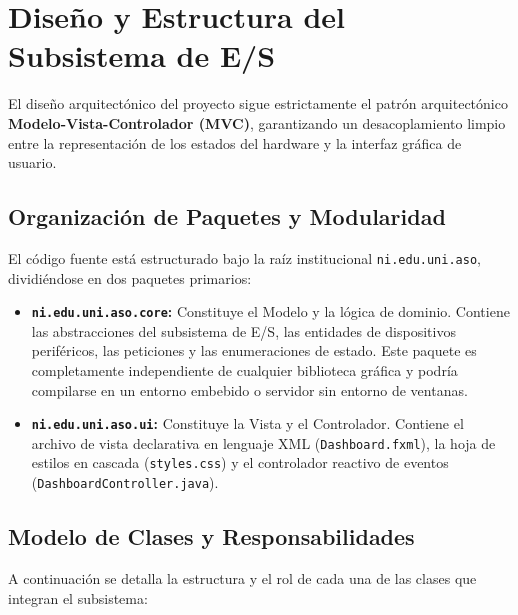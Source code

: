 \documentclass[11pt,letterpaper]{article}
\begin{document}
\section{Diseño y Estructura del Subsistema de E/S}

El diseño arquitectónico del proyecto sigue estrictamente el patrón arquitectónico \textbf{Modelo-Vista-Controlador (MVC)}, garantizando un desacoplamiento limpio entre la representación de los estados del hardware y la interfaz gráfica de usuario.

\subsection{Organización de Paquetes y Modularidad}
El código fuente está estructurado bajo la raíz institucional \texttt{ni.edu.uni.aso}, dividiéndose en dos paquetes primarios:
\begin{itemize}
    \item \textbf{\texttt{ni.edu.uni.aso.core}:} Constituye el Modelo y la lógica de dominio. Contiene las abstracciones del subsistema de E/S, las entidades de dispositivos periféricos, las peticiones y las enumeraciones de estado. Este paquete es completamente independiente de cualquier biblioteca gráfica y podría compilarse en un entorno embebido o servidor sin entorno de ventanas.
    \item \textbf{\texttt{ni.edu.uni.aso.ui}:} Constituye la Vista y el Controlador. Contiene el archivo de vista declarativa en lenguaje XML (\texttt{Dashboard.fxml}), la hoja de estilos en cascada (\texttt{styles.css}) y el controlador reactivo de eventos (\texttt{DashboardController.java}).
\end{itemize}

\subsection{Modelo de Clases y Responsabilidades}

A continuación se detalla la estructura y el rol de cada una de las clases que integran el subsistema:
\end{document}
